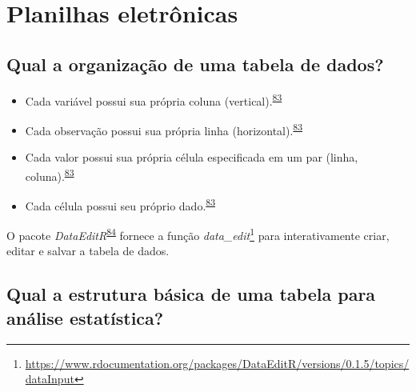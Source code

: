 \documentclass[
  a4paper,
]{book}
\renewcommand{\href}[2]{#2\footnote{\url{#1}}}
\newenvironment{infobox}[1]
  {
  \begin{itemize}
  \renewcommand{\labelitemi}{
    \raisebox{-.7\height}[0pt][0pt]{
      {\setkeys{Gin}{width=3em,keepaspectratio}
        \texttt{[image: \#1]}}
    }
  }
  \setlength{\fboxsep}{1em}
  \begin{blackbox}
  \item
  }
  {
  \end{blackbox}
  \end{itemize}
  }
\begin{document}
\hypertarget{planilhas}{%
\section{Planilhas eletrônicas}\label{planilhas}}

\hypertarget{qual-a-organizauxe7uxe3o-de-uma-tabela-de-dados}{%
\subsection{Qual a organização de uma tabela de dados?}\label{qual-a-organizauxe7uxe3o-de-uma-tabela-de-dados}}

\begin{itemize}
\item
  Cada variável possui sua própria coluna (vertical).\textsuperscript{\protect\hyperlink{ref-tierney2023}{83}}
\item
  Cada observação possui sua própria linha (horizontal).\textsuperscript{\protect\hyperlink{ref-tierney2023}{83}}
\item
  Cada valor possui sua própria célula especificada em um par (linha, coluna).\textsuperscript{\protect\hyperlink{ref-tierney2023}{83}}
\item
  Cada célula possui seu próprio dado.\textsuperscript{\protect\hyperlink{ref-tierney2023}{83}}
\end{itemize}

\begin{infobox}{images/Rlogo}
O pacote \emph{DataEditR}\textsuperscript{\protect\hyperlink{ref-DataEditR}{84}} fornece a função \href{https://www.rdocumentation.org/packages/DataEditR/versions/0.1.5/topics/dataInput}{\emph{data\_edit}} para interativamente criar, editar e salvar a tabela de dados.

\end{infobox}

\hypertarget{qual-a-estrutura-buxe1sica-de-uma-tabela-para-anuxe1lise-estatuxedstica}{%
\subsection{Qual a estrutura básica de uma tabela para análise estatística?}\label{qual-a-estrutura-buxe1sica-de-uma-tabela-para-anuxe1lise-estatuxedstica}}
\end{document}
